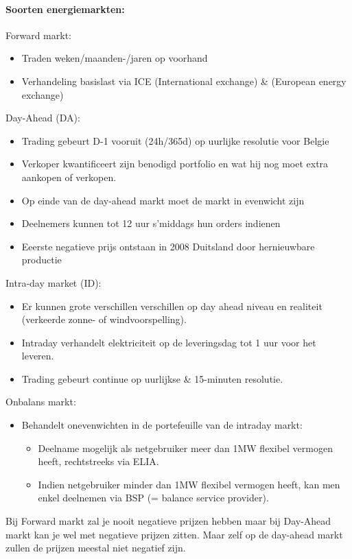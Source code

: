 \documentclass[12pt]{article}
\begin{document}
\paragraph{Soorten energiemarkten:}
Forward markt:\begin{itemize}
    \item Traden weken/maanden-/jaren op voorhand 
    \item Verhandeling basislast via ICE (International exchange) \& (European energy exchange)
\end{itemize}
Day-Ahead (DA):\begin{itemize}
    \item Trading gebeurt D-1 vooruit (24h/365d) op uurlijke resolutie voor Belgie 
    \item Verkoper kwantificeert zijn benodigd portfolio en wat hij nog moet extra aankopen of verkopen.
    \item Op einde van de day-ahead markt moet de markt in evenwicht zijn
    \item Deelnemers kunnen tot 12 uur s'middags hun orders indienen
    \item Eeerste negatieve prijs ontstaan in 2008 Duitsland door hernieuwbare productie
\end{itemize}
Intra-day market (ID):\begin{itemize}
    \item Er kunnen grote verschillen verschillen op day ahead niveau en realiteit (verkeerde zonne- of windvoorspelling).
    \item Intraday verhandelt elektriciteit op de leveringsdag tot 1 uur voor het leveren.
    \item Trading gebeurt continue op uurlijkse \& 15-minuten resolutie.
\end{itemize}
Onbalans markt:\begin{itemize}
    \item Behandelt onevenwichten in de portefeuille van de intraday markt:\begin{itemize}
        \item Deelname mogelijk als netgebruiker meer dan 1MW flexibel vermogen heeft, rechtstreeks via ELIA.
        \item Indien netgebruiker minder dan 1MW flexibel vermogen heeft, kan men enkel deelnemen via BSP (= balance service provider).
    \end{itemize}
\end{itemize}
Bij Forward markt zal je nooit negatieve prijzen hebben maar bij Day-Ahead markt kan je wel met negatieve prijzen zitten. Maar zelf op de day-ahead markt zullen de prijzen meestal niet negatief zijn.
\end{document}

